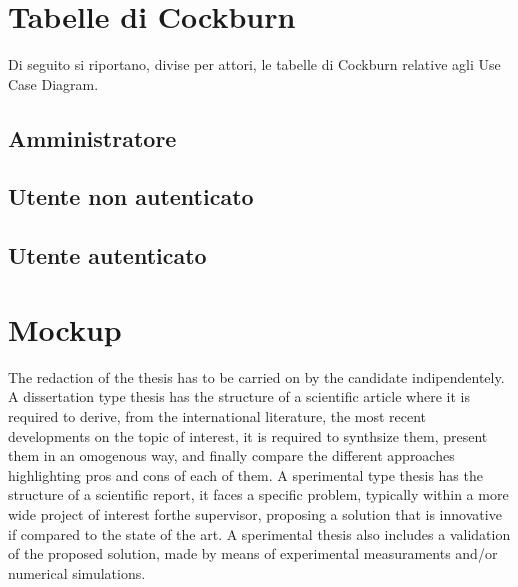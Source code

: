 \section{Tabelle di Cockburn}
Di seguito si riportano, divise per attori, le tabelle di Cockburn relative agli Use Case Diagram.
\subsection{Amministratore}



\pagebreak
\subsection{Utente non autenticato} %





\subsection{Utente autenticato}


\pagebreak
\section{Mockup}

The redaction of the thesis has to be carried on by the candidate indipendentely. A dissertation type thesis has the structure of a scientific article where it is required to derive, from the international literature, the most recent developments on the topic of interest, it is required to synthsize them, present them in an omogenous way, and finally compare the different approaches highlighting pros and cons of each of them. A sperimental type thesis has the structure of a scientific report, it faces a specific problem, typically within a more wide project of interest forthe supervisor, proposing a solution that is innovative if compared to the state of the art. A sperimental thesis also includes a validation of the proposed solution, made by means of experimental measuraments and/or numerical simulations.

